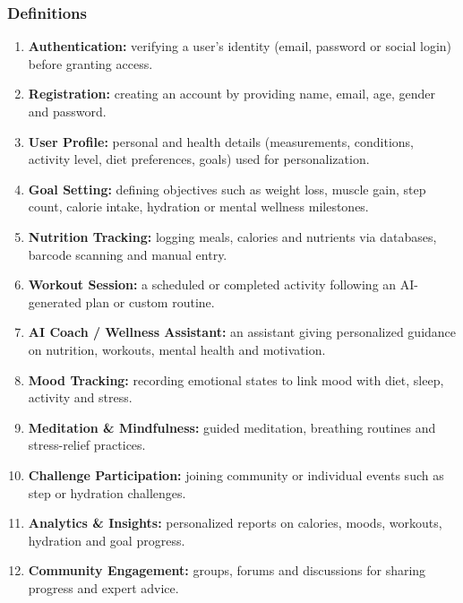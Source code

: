 \documentclass[11pt,a4paper]{report}
\begin{document}
\subsubsection*{Definitions}
\begin{enumerate}
 \item \textbf{Authentication:} verifying a user's identity (email, password or social login) before granting access.
 \item \textbf{Registration:} creating an account by providing name, email, age, gender and password.
 \item \textbf{User Profile:} personal and health details (measurements, conditions, activity level, diet preferences, goals) used for personalization.
 \item \textbf{Goal Setting:} defining objectives such as weight loss, muscle gain, step count, calorie intake, hydration or mental wellness milestones.
 \item \textbf{Nutrition Tracking:} logging meals, calories and nutrients via databases, barcode scanning and manual entry.
 \item \textbf{Workout Session:} a scheduled or completed activity following an AI-generated plan or custom routine.
 \item \textbf{AI Coach / Wellness Assistant:} an assistant giving personalized guidance on nutrition, workouts, mental health and motivation.
 \item \textbf{Mood Tracking:} recording emotional states to link mood with diet, sleep, activity and stress.
 \item \textbf{Meditation \& Mindfulness:} guided meditation, breathing routines and stress-relief practices.
 \item \textbf{Challenge Participation:} joining community or individual events such as step or hydration challenges.
 \item \textbf{Analytics \& Insights:} personalized reports on calories, moods, workouts, hydration and goal progress.
 \item \textbf{Community Engagement:} groups, forums and discussions for sharing progress and expert advice.
\end{enumerate}
\end{document}
